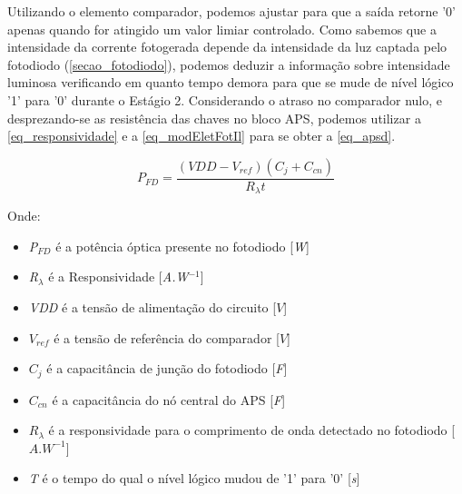 Utilizando o elemento comparador, podemos ajustar para que a sa\'ida retorne '0' apenas quando for atingido um valor limiar controlado. Como sabemos que a intensidade da corrente fotogerada depende da intensidade da luz captada pelo fotodiodo (\autoref{secao_fotodiodo}), podemos deduzir a informa{\c c}\~ao sobre intensidade luminosa verificando em quanto tempo demora para que se mude de n\'ivel l\'ogico '1' para '0' durante o Est\'agio 2. Considerando o atraso no comparador nulo, e desprezando-se as resistência das chaves no bloco APS, podemos utilizar a \autoref{eq_responsividade} e a \autoref{eq_modEletFotIl} para se obter a \autoref{eq_apsd}.

\begin{equation}
    \label{eq_apsd}
    P_{FD} = \frac{(VDD-V_{ref})(C_{j}+C_{cn})}{R_{\lambda}t}
\end{equation}

Onde:

\begin{itemize}

    \item \emph{P$_{FD}$} \'e a pot\^encia \'optica presente no fotodiodo [\emph{W}]
    \item \emph{R$_\lambda$} \'e a Responsividade [\emph{A.W$^{-1}$}]
    \item \emph{VDD} \'e a tens\~ao de alimenta{\c c}\~ao do circuito [$V$]
    \item \emph{$V_{ref}$} \'e a tens\~ao de refer\^encia do comparador [$V$]
    \item \emph{$C_j$} \'e a capacit\^ancia de jun{\c c}\~ao do fotodiodo [\emph{F}]
    \item \emph{$C_{cn}$} \'e a capacit\^ancia do n\'o central do APS [\emph{F}]
    \item $R_{\lambda}$ \'e a responsividade para o comprimento de onda detectado no fotodiodo [$A.W^{-1}$]
    \item \emph{T} \'e o tempo do qual o n\'ivel l\'ogico mudou de '1' para '0' [\emph{s}]
    
\end{itemize}